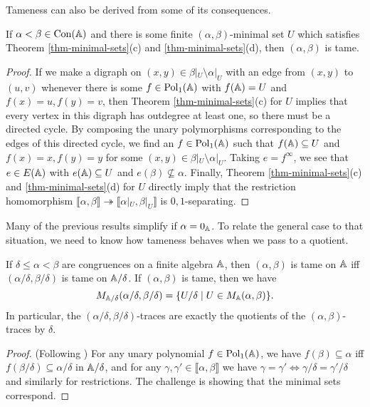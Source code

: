 \begin{appendices}
Tameness can also be derived from some of its consequences.

\begin{prop} If $\alpha < \beta \in \operatorname{Con}(\mathbb{A})$ and there is some finite $(\alpha,\beta)$-minimal set $U$ which satisfies Theorem \ref{thm-minimal-sets}(c) and \ref{thm-minimal-sets}(d), then $(\alpha,\beta)$ is tame.
\end{prop}
\begin{proof} If we make a digraph on $(x,y) \in \beta|_U\setminus\alpha|_U$ with an edge from $(x,y)$ to $(u,v)$ whenever there is some $f \in \operatorname{Pol}_1(\mathbb{A})$ with $f(\mathbb{A}) = U$ and $f(x) = u, f(y) = v$, then Theorem \ref{thm-minimal-sets}(c) for $U$ implies that every vertex in this digraph has outdegree at least one, so there must be a directed cycle. By composing the unary polymorphisms corresponding to the edges of this directed cycle, we find an $f \in \operatorname{Pol}_1(\mathbb{A})$ such that $f(\mathbb{A}) \subseteq U$ and $f(x) = x, f(y) = y$ for some $(x,y) \in \beta|_U\setminus\alpha|_U$. Taking $e = f^\infty$, we see that $e \in E(\mathbb{A})$ with $e(\mathbb{A}) \subseteq U$ and $e(\beta) \not\subseteq \alpha$. Finally, Theorem \ref{thm-minimal-sets}(c) and \ref{thm-minimal-sets}(d) for $U$ directly imply that the restriction homomorphism $\llbracket \alpha, \beta \rrbracket \twoheadrightarrow \llbracket \alpha|_U, \beta|_U \rrbracket$ is $0,1$-separating.
\end{proof}

Many of the previous results simplify if $\alpha = 0_{\mathbb{A}}$. To relate the general case to that situation, we need to know how tameness behaves when we pass to a quotient.

\begin{prop}\label{prop-tame-quotient} If $\delta \le \alpha < \beta$ are congruences on a finite algebra $\mathbb{A}$, then $(\alpha,\beta)$ is tame on $\mathbb{A}$ iff $(\alpha/\delta, \beta/\delta)$ is tame on $\mathbb{A}/\delta$. If $(\alpha,\beta)$ is tame, then we have
\[
M_{\mathbb{A}/\delta}(\alpha/\delta,\beta/\delta) = \{U/\delta \mid U \in M_{\mathbb{A}}(\alpha,\beta)\}.
\]
In particular, the $(\alpha/\delta,\beta/\delta)$-traces are exactly the quotients of the $(\alpha,\beta)$-traces by $\delta$.
\end{prop}
\begin{proof} (Following \cite{hobby-mckenzie}) For any unary polynomial $f \in \operatorname{Pol}_1(\mathbb{A})$, we have $f(\beta) \subseteq \alpha$ iff $f(\beta/\delta) \subseteq \alpha/\delta$ in $\mathbb{A}/\delta$, and for any $\gamma, \gamma' \in \llbracket \alpha, \beta \rrbracket$ we have $\gamma = \gamma' \iff \gamma/\delta = \gamma'/\delta$ and similarly for restrictions. The challenge is showing that the minimal sets correspond.%


\end{proof}
\end{appendices}
